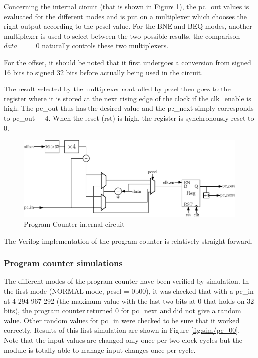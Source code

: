 Concerning the internal circuit (that is shown in Figure \ref{fig:components/pc_in}), the pc\_out 
values is evaluated for the different modes and 
is put on a multiplexer which chooses the right output according to the pcsel value. For the BNE 
and BEQ modes, another multiplexer is used to select between the two possible results, the comparison $data == 0$ naturally controls these two multiplexers. 

For the offset, it should be noted that it first undergoes a conversion from
signed 16 bits to signed 32 bits before actually being used in the circuit.

The result selected by the multiplexer controlled by pcsel then goes to the register where it is 
stored at the next rising edge of the clock if the clk\_enable is high. The 
pc\_out thus has the desired value and the pc\_next simply corresponds to pc\_out + 4. When 
the reset (rst) is high, the register is synchronously reset to 0.

\begin{figure}[H]
    \centering
    \includegraphics[width=\linewidth]{Chapter3-CPU/res/pc_internal}
    \caption{Program Counter internal circuit}
    \label{fig:components/pc_in}
\end{figure}


The Verilog implementation of the program counter is relatively straight-forward.

\subsubsection*{Program counter simulations}

The different modes of the program counter have been verified by simulation. In the first mode 
(NORMAL mode, pcsel = 0b00), it was checked that with a pc\_in at 4 294 967 292 (the maximum value with 
the last two bits at 0 that holds on 32 bits), the program counter returned 0 for pc\_next and did not 
give a random value. Other random values for pc\_in were checked to be sure that it worked 
correctly. Results of this first simulation are shown in Figure \ref{fig:sim/pc_00}. Note that the
input values are changed only once per two clock cycles but the module is totally able to manage
input changes once per cycle.

